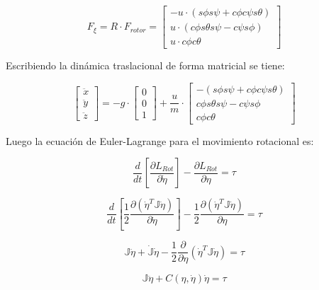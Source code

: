 \documentclass[../main.tex]{subfiles}
\begin{document}
\begin{equation}
F_{\xi}=R\cdot F_{rotor}=\begin{bmatrix}-u\cdot(s\phi s\psi+c\phi c\psi s\theta)\\
u\cdot(c\phi s\theta s\psi-c\psi s\phi)\\
u\cdot c\phi c\theta
\end{bmatrix}
\end{equation}

Escribiendo la dinámica traslacional de forma matricial se tiene:

\begin{equation}
\begin{bmatrix}\ddot{x}\\
\ddot{y}\\
\ddot{z}
\end{bmatrix}=-g\cdot\begin{bmatrix}0\\
0\\
1
\end{bmatrix}+\frac{u}{m}\cdot\begin{bmatrix}-(s\phi s\psi+c\phi c\psi s\theta)\\
c\phi s\theta s\psi-c\psi s\phi\\
c\phi c\theta
\end{bmatrix}
\end{equation}

Luego la ecuación de Euler-Lagrange para el movimiento rotacional
es:

\begin{equation}
\frac{d}{dt}\left[\frac{\partial L_{Rot}}{\partial\dot{\eta}}\right]-\frac{\partial L_{Rot}}{\partial\eta}=\tau
\end{equation}

\begin{equation}
\frac{d}{dt}\left[\frac{1}{2}\frac{\partial(\dot{\eta}^{T}\mathbb{J}\dot{\eta})}{\partial\dot{\eta}}\right]-\frac{1}{2}\frac{\partial(\dot{\eta}^{T}\mathbb{J}\dot{\eta})}{\partial\eta}=\tau
\end{equation}

\begin{equation}
\mathbb{J}\ddot{\eta}+\dot{\mathbb{J}}\dot{\eta}-\frac{1}{2}\frac{\partial}{\partial\eta}(\dot{\eta}^{T}\mathbb{J}\dot{\eta})=\tau
\end{equation}

\begin{equation}
\mathbb{J}\ddot{\eta}+C(\eta,\dot{\eta})\dot{\eta}=\tau\label{eq:rotacional lagrangeano}
\end{equation}
\end{document}
